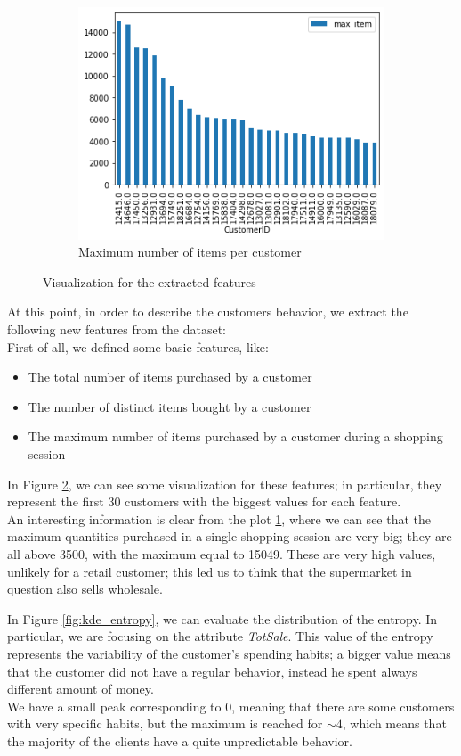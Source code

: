\begin{figure}[h!]
\begin{subfigure}{.3\textwidth}
\includegraphics[width=\textwidth]{img/max_item.png}
\caption{Maximum number of items per customer}
\label{fig:max_item}
\end{subfigure}
\caption{Visualization for the extracted features}
\label{fig:first_features}
\end{figure}

At this point, in order to describe the customers behavior, we extract the following new features from the dataset:\\
First of all, we defined some basic features, like:
\begin{itemize}
\item The total number of items purchased by a customer
\item The number of distinct items bought by a customer
\item The maximum number of items purchased by a customer during a shopping session
\end{itemize}

In Figure \ref{fig:first_features}, we can see some visualization for these features; in particular, they represent the first 30 customers with the biggest values for each feature.\\
An interesting information is clear from the plot \ref{fig:max_item}, where we can see that the maximum quantities purchased in a single shopping session are very big; they are all above 3500, with the maximum equal to 15049. These are very high values, unlikely for a retail customer; this led us to think that the supermarket in question also sells wholesale.

In Figure \ref{fig:kde_entropy}, we can evaluate the distribution of the entropy. In particular, we are focusing on the attribute \emph{TotSale}.
This value of the entropy represents the variability of the customer's spending habits; a bigger value means that the customer did not have a regular behavior, instead he spent always different amount of money.\\
We have a small peak corresponding to 0, meaning that there are some customers with very specific habits, but the maximum is reached for $\sim 4$, which means that the majority of the clients have a quite unpredictable behavior.

